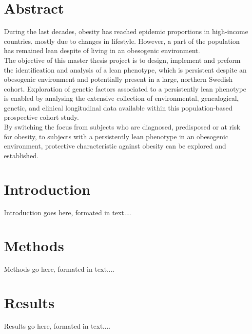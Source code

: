 \documentclass[a4paper,12pt]{article}
\begin{document}
\section*{Abstract}
During the last decades, obesity has reached epidemic proportions in high-income countries, mostly due to changes in lifestyle. However, a part of the population has remained lean despite of living in an obesogenic environment.\\The objective of this master thesis project is to design, implement and preform the identification and analysis of a lean phenotype, which is persistent despite an obesogenic environment and potentially present in a large, northern Swedish cohort. Exploration of genetic factors associated to a persistently lean phenotype is enabled by analysing the extensive collection of environmental, genealogical, genetic, and clinical longitudinal data available within this population-based prospective cohort study.\\ 
By switching the focus from subjects who are diagnosed, predisposed or at risk for obesity, to subjects with a persistently lean phenotype in an obesogenic environment, protective characteristic against obesity can be explored and established. 

\newpage

\phantom{p}
\vfill

\newpage

\tableofcontents
\listoffigures 
\listoftables

\newpage

\section{Introduction}
\setcounter{equation}{0}



Introduction goes here, formated in text....

\section{Methods}
\setcounter{equation}{0}

Methods go here, formated in text....

\section{Results}
\setcounter{equation}{0}

Results go here, formated in text....
\end{document}
